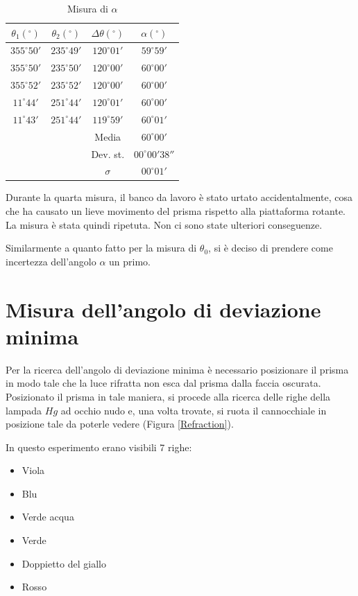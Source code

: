 \documentclass{article}
\begin{document}
\begin{table}[h!]
\centering
\begin{tabular}{ | c | c | c | c | }
  \hline
  $\theta _1 (^{\circ})$ & $\theta _2 (^{\circ})$ & $\Delta \theta (^{\circ})$ & $\alpha (^{\circ})$ \\
  \hline
  $355^{\circ} 50'$ & $235^{\circ} 49'$ & $120^{\circ} 01'$ & $59^{\circ} 59'$ \\
  $355^{\circ} 50'$ & $235^{\circ} 50'$ & $120^{\circ} 00'$ & $60^{\circ} 00'$ \\
  $355^{\circ} 52'$ & $235^{\circ} 52'$ & $120^{\circ} 00'$ & $60^{\circ} 00'$ \\
  $11^{\circ} 44'$ & $251^{\circ} 44'$ & $120^{\circ} 01'$ & $60^{\circ} 00'$ \\
  $11^{\circ} 43'$ & $251^{\circ} 44'$ & $119^{\circ} 59'$ & $60^{\circ} 01'$ \\
  \hline
  && Media & $60^{\circ} 00'$ \\
  && Dev. st. & $00^{\circ} 00' 38''$ \\
  && $\sigma$ & $00^{\circ} 01'$ \\
  \hline
\end{tabular}
  \caption{Misura di $\alpha$}
  \label{table:1}
\end{table}

Durante la quarta misura, il banco da lavoro è stato urtato accidentalmente, cosa che ha causato un lieve movimento del prisma rispetto alla piattaforma rotante. La misura è stata quindi ripetuta. Non ci sono state ulteriori conseguenze.

Similarmente a quanto fatto per la misura di $\theta _0$, si è deciso di prendere come incertezza dell'angolo $\alpha$ un primo.


\section{Misura dell'angolo di deviazione minima}

Per la ricerca dell'angolo di deviazione minima è necessario posizionare il prisma in modo tale che la luce rifratta non esca dal prisma dalla faccia oscurata. Posizionato il prisma in tale maniera, si procede alla ricerca delle righe della lampada $Hg$ ad occhio nudo e, una volta trovate, si ruota il cannocchiale in posizione tale da poterle vedere (Figura \ref{Refraction}).

In questo esperimento erano visibili 7 righe:

\begin{itemize}
  \item Viola
  \item Blu
  \item Verde acqua
  \item Verde
  \item Doppietto del giallo
  \item Rosso
\end{itemize}
\end{document}
